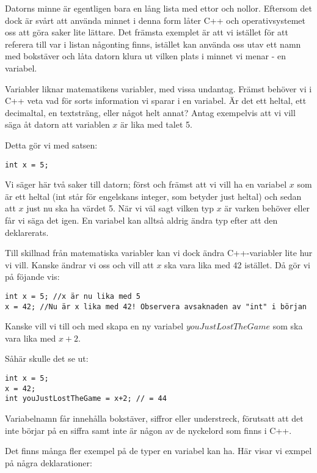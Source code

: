 Datorns minne är egentligen bara en lång lista med ettor och nollor. Eftersom det dock är svårt att använda minnet i denna form låter C++ och operativsystemet oss att göra saker lite lättare. Det främsta exemplet är att vi istället för att referera till var i listan någonting finns, istället kan använda oss utav ett namn med bokstäver och låta datorn klura ut vilken plats i minnet vi menar - en variabel.

Variabler liknar matematikens variabler, med vissa undantag. Främst behöver vi i C++ veta vad för sorts information vi sparar i en variabel. Är det ett heltal, ett decimaltal, en textsträng, eller något helt annat? Antag exempelvis att vi vill säga åt datorn att variablen $x$ är lika med talet 5.

Detta gör vi med satsen:
\begin{lstlisting}
int x = 5;
\end{lstlisting}

Vi säger här två saker till datorn; först och främst att vi vill ha en variabel $x$ som är ett heltal (int står för engelskans integer, som betyder just heltal) och sedan att $x$ just nu ska ha värdet 5. När vi väl sagt vilken typ $x$ är varken behöver eller får vi säga det igen. En variabel kan alltså aldrig ändra typ efter att den deklarerats.

Till skillnad från matematiska variabler kan vi dock ändra C++-variabler lite hur vi vill. Kanske ändrar vi oss och vill att $x$ ska vara lika med 42 istället. Då gör vi på föjande vis:

\begin{lstlisting}
int x = 5; //x är nu lika med 5
x = 42; //Nu är x lika med 42! Observera avsaknaden av "int" i början
\end{lstlisting}

Kanske vill vi till och med skapa en ny variabel $youJustLostTheGame$ som ska vara lika med $x+2$.

Såhär skulle det se ut:

\begin{lstlisting}
int x = 5;
x = 42;
int youJustLostTheGame = x+2; // = 44
\end{lstlisting}

Variabelnamn får innehålla bokstäver, siffror eller understreck, förutsatt att det inte börjar på en siffra samt inte är någon av de nyckelord som finns i C++.

Det finns många fler exempel på de typer en variabel kan ha. Här visar vi exmpel på några deklarationer:

